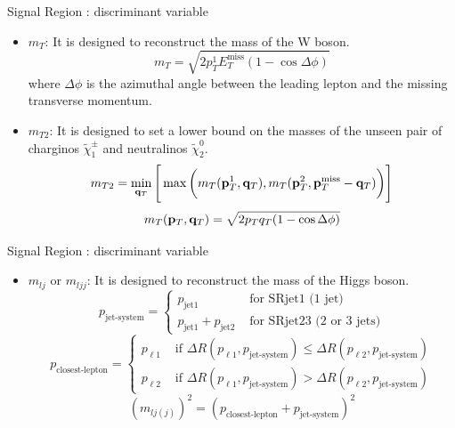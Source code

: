 \documentclass[mathserif,serif]{beamer}
\begin{document}
\begin{frame}{Signal Region : discriminant variable}
\begin{itemize}
\item $m_T$: It is designed to reconstruct the mass of the W boson.
\begin{equation*}
m_T = \sqrt{ 2 p_T^1 E_T^{\text{miss}} ( 1 - \cos{\Delta\phi} ) }
\end{equation*}
where $\Delta\phi$ is the azimuthal angle between the leading lepton and the missing transverse momentum.
\item $m_{T2}$: It is designed to set a lower bound on the masses of the unseen pair of charginos $\tilde{\chi}_1^\pm$ and neutralinos $\tilde{\chi}_2^0$.
\begin{equation*}
m_{T2} = \min_{{\bf q}_T} \Bigg[ \max \bigg( m_T( {\bf p}_T^1, {\bf q}_T ), m_T( {\bf p}_T^2, {\bf p}_T^{\text{miss}} - {\bf q}_T ) \bigg) \Bigg]
\end{equation*}
\begin{equation*}
m_T( {\bf p}_T, {\bf q}_T ) = \sqrt{ 2 p_T q_T ( 1 - \cos{\Delta\phi} ) }
\end{equation*}
\end{itemize}
\end{frame}

\begin{frame}{Signal Region : discriminant variable}
\begin{itemize}
\item $m_{lj}$ or $m_{ljj}$: It is designed to reconstruct the mass of the Higgs boson.
\begin{equation*}
p_{\text{jet-system}} =
\left\{
\begin{array}{ll}
p_{\text{jet1}} &\text{ for SRjet1 (1 jet)}\\
p_{\text{jet1}} + p_{\text{jet2}} &\text{ for SRjet23 (2 or 3 jets)}
\end{array} \right.
\end{equation*}
\begin{equation*}
p_{\text{closest-lepton}} =
\left\{
\begin{array}{ll}
p_{\ell 1} &\text{ if } \Delta R(p_{\ell 1},p_{\text{jet-system}}) \leq \Delta R(p_{\ell 2},p_{\text{jet-system}}) \\
p_{\ell 2} &\text{ if } \Delta R(p_{\ell 1},p_{\text{jet-system}}) > \Delta R(p_{\ell 2},p_{\text{jet-system}})
\end{array} \right.
\end{equation*}
\begin{equation*}
(m_{lj(j)})^2 = (p_{\text{closest-lepton}} + p_{\text{jet-system}})^2
\end{equation*}
\end{itemize}
\end{frame}
\end{document}
